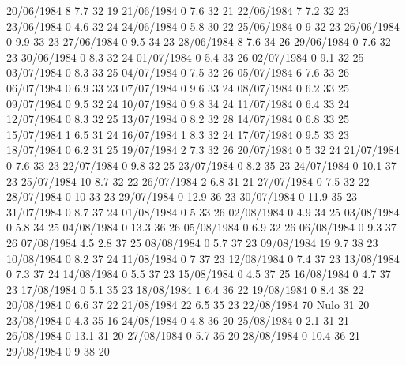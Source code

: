 20/06/1984  8      7.7    32     19 
21/06/1984  0      7.6    32     21 
22/06/1984  7      7.2    32     23 
23/06/1984  0      4.6    32     24 
24/06/1984  0      5.8    30     22 
25/06/1984  0      9      32     23 
26/06/1984  0      9.9    33     23 
27/06/1984  0      9.5    34     23 
28/06/1984  8      7.6    34     26 
29/06/1984  0      7.6    32     23 
30/06/1984  0      8.3    32     24 
01/07/1984  0      5.4    33     26 
02/07/1984  0      9.1    32     25 
03/07/1984  0      8.3    33     25 
04/07/1984  0      7.5    32     26 
05/07/1984  6      7.6    33     26 
06/07/1984  0      6.9    33     23 
07/07/1984  0      9.6    33     24 
08/07/1984  0      6.2    33     25 
09/07/1984  0      9.5    32     24 
10/07/1984  0      9.8    34     24 
11/07/1984  0      6.4    33     24 
12/07/1984  0      8.3    32     25 
13/07/1984  0      8.2    32     28 
14/07/1984  0      6.8    33     25 
15/07/1984  1      6.5    31     24 
16/07/1984  1      8.3    32     24 
17/07/1984  0      9.5    33     23 
18/07/1984  0      6.2    31     25 
19/07/1984  2      7.3    32     26 
20/07/1984  0      5      32     24 
21/07/1984  0      7.6    33     23 
22/07/1984  0      9.8    32     25 
23/07/1984  0      8.2    35     23 
24/07/1984  0      10.1   37     23 
25/07/1984  10     8.7    32     22 
26/07/1984  2      6.8    31     21 
27/07/1984  0      7.5    32     22 
28/07/1984  0      10     33     23 
29/07/1984  0      12.9   36     23 
30/07/1984  0      11.9   35     23 
31/07/1984  0      8.7    37     24 
01/08/1984  0      5      33     26 
02/08/1984  0      4.9    34     25 
03/08/1984  0      5.8    34     25 
04/08/1984  0      13.3   36     26 
05/08/1984  0      6.9    32     26 
06/08/1984  0      9.3    37     26 
07/08/1984  4.5    2.8    37     25 
08/08/1984  0      5.7    37     23 
09/08/1984  19     9.7    38     23 
10/08/1984  0      8.2    37     24 
11/08/1984  0      7      37     23 
12/08/1984  0      7.4    37     23 
13/08/1984  0      7.3    37     24 
14/08/1984  0      5.5    37     23 
15/08/1984  0      4.5    37     25 
16/08/1984  0      4.7    37     23 
17/08/1984  0      5.1    35     23 
18/08/1984  1      6.4    36     22 
19/08/1984  0      8.4    38     22 
20/08/1984  0      6.6    37     22 
21/08/1984  22     6.5    35     23 
22/08/1984  70    Nulo    31     20 
23/08/1984  0      4.3    35     16 
24/08/1984  0      4.8    36     20 
25/08/1984  0      2.1    31     21 
26/08/1984  0      13.1   31     20 
27/08/1984  0      5.7    36     20 
28/08/1984  0      10.4   36     21 
29/08/1984  0      9      38     20 
